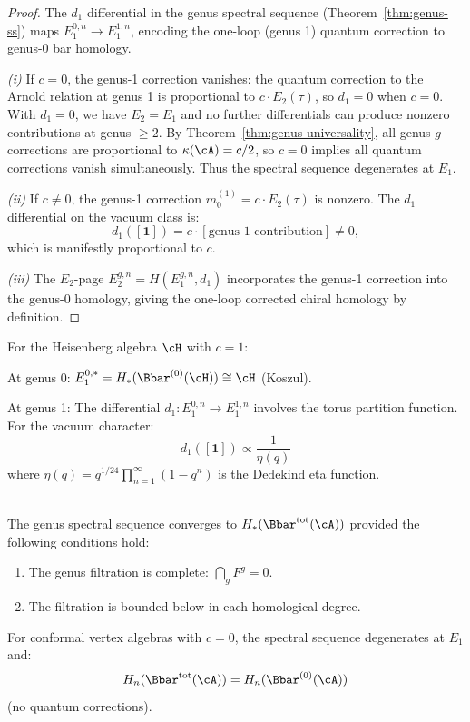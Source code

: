 \begin{proof}
The $d_1$ differential in the genus spectral sequence (Theorem~\ref{thm:genus-ss}) maps $E_1^{0,n} \to E_1^{1,n}$, encoding the one-loop (genus 1) quantum correction to genus-0 bar homology.

\emph{(i)} If $c = 0$, the genus-1 correction vanishes: the quantum correction to the Arnold relation at genus 1 is proportional to $c \cdot E_2(\tau)$, so $d_1 = 0$ when $c = 0$. With $d_1 = 0$, we have $E_2 = E_1$ and no further differentials can produce nonzero contributions at genus $\geq 2$.  By Theorem~\ref{thm:genus-universality}, all genus-$g$ corrections are proportional to $\kappa(\cA) = c/2$, so $c = 0$ implies all quantum corrections vanish simultaneously.  Thus the spectral sequence degenerates at $E_1$.

\emph{(ii)} If $c \neq 0$, the genus-1 correction $m_0^{(1)} = c \cdot E_2(\tau)$ is nonzero. The $d_1$ differential on the vacuum class is:
\[
d_1([\mathbf{1}]) = c \cdot [\text{genus-1 contribution}] \neq 0,
\]
which is manifestly proportional to $c$.

\emph{(iii)} The $E_2$-page $E_2^{g,n} = H(E_1^{g,n}, d_1)$ incorporates the genus-1 correction into the genus-0 homology, giving the one-loop corrected chiral homology by definition.
\end{proof}

\begin{example}
\label{ex:heisenberg-genus-ss}
For the Heisenberg algebra $\cH$ with $c = 1$:

At genus 0: $E_1^{0,*} = H_*(\Bbar^{(0)}(\cH)) \cong \cH$ (Koszul).

At genus 1: The differential $d_1: E_1^{0,n} \to E_1^{1,n}$ involves the torus 
partition function. For the vacuum character:
\[
d_1([\mathbf{1}]) \propto \frac{1}{\eta(q)}
\]
where $\eta(q) = q^{1/24} \prod_{n=1}^\infty (1 - q^n)$ is the Dedekind eta function.
\end{example}

\begin{theorem}
\label{thm:genus-ss-convergence}
\leavevmode\\
The genus spectral sequence converges to $H_*(\Bbar^{\mathrm{tot}}(\cA))$
provided the following conditions hold:
\begin{enumerate}[label=(\roman*)]
\item The genus filtration is complete: $\bigcap_g F^g = 0$.
\item The filtration is bounded below in each homological degree.
\end{enumerate}
For conformal vertex algebras with $c = 0$, the spectral sequence degenerates 
at $E_1$ and:
\[
H_n(\Bbar^{\mathrm{tot}}(\cA)) = H_n(\Bbar^{(0)}(\cA))
\]
(no quantum corrections).
\end{theorem}


